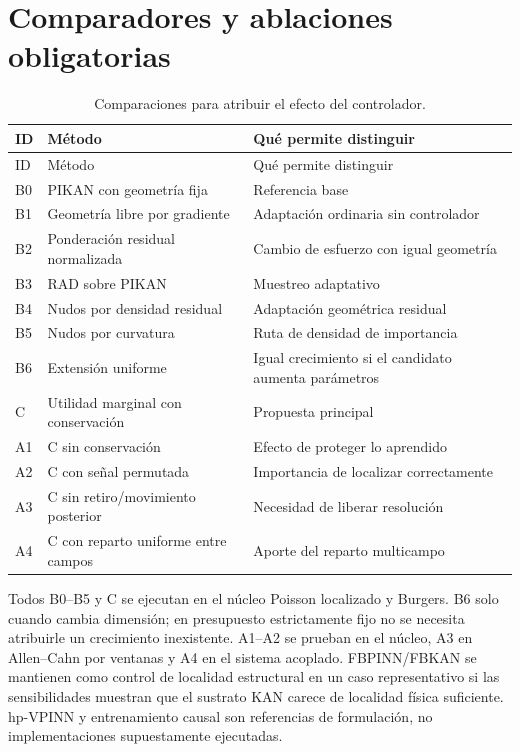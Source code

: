 \section{Comparadores y ablaciones obligatorias}
\begin{longtable}{p{.12\linewidth}p{.39\linewidth}p{.40\linewidth}}
\caption{Comparaciones para atribuir el efecto del controlador.}\label{tab:baselines}\\\toprule
ID & Método & Qué permite distinguir\\\midrule\endfirsthead
\toprule ID & Método & Qué permite distinguir\\\midrule\endhead
B0 & PIKAN con geometría fija & Referencia base\\
B1 & Geometría libre por gradiente & Adaptación ordinaria sin controlador\\
B2 & Ponderación residual normalizada & Cambio de esfuerzo con igual geometría\\
B3 & RAD sobre PIKAN & Muestreo adaptativo \cite{wu2023sampling}\\
B4 & Nudos por densidad residual & Adaptación geométrica residual\\
B5 & Nudos por curvatura & Ruta de densidad de importancia \cite{rigas2026}\\
B6 & Extensión uniforme & Igual crecimiento si el candidato aumenta parámetros\\
C & Utilidad marginal con conservación & Propuesta principal\\
A1 & C sin conservación & Efecto de proteger lo aprendido\\
A2 & C con señal permutada & Importancia de localizar correctamente\\
A3 & C sin retiro/movimiento posterior & Necesidad de liberar resolución\\
A4 & C con reparto uniforme entre campos & Aporte del reparto multicampo\\
\bottomrule\end{longtable}
Todos B0--B5 y C se ejecutan en el núcleo Poisson localizado y Burgers. B6 solo cuando cambia dimensión; en presupuesto estrictamente fijo no se necesita atribuirle un crecimiento inexistente. A1--A2 se prueban en el núcleo, A3 en Allen--Cahn por ventanas y A4 en el sistema acoplado. FBPINN/FBKAN se mantienen como control de localidad estructural en un caso representativo si las sensibilidades muestran que el sustrato KAN carece de localidad física suficiente. hp-VPINN y entrenamiento causal son referencias de formulación, no implementaciones supuestamente ejecutadas.

